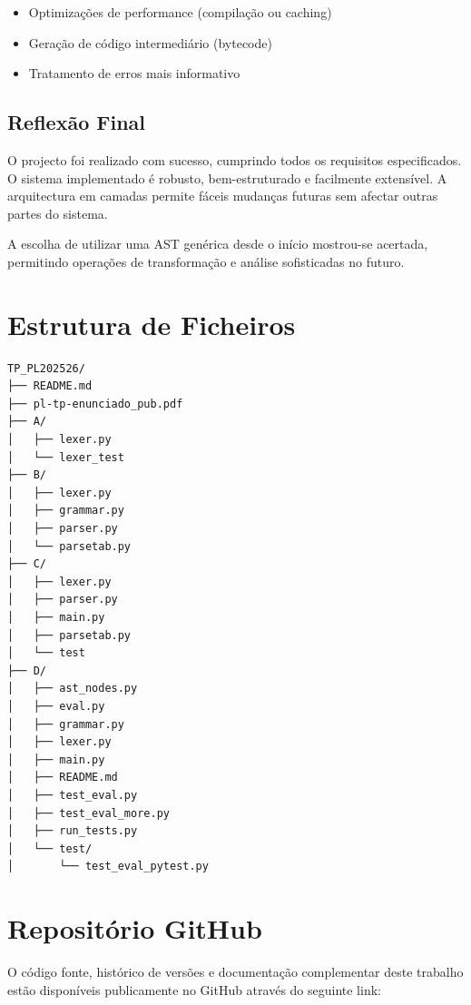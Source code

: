 \documentclass[11pt,a4paper]{report}
\begin{document}
\begin{itemize}
    \item Optimizações de performance (compilação ou caching)
    \item Geração de código intermediário (bytecode)
    \item Tratamento de erros mais informativo
\end{itemize}

\section{Reflexão Final}

O projecto foi realizado com sucesso, cumprindo todos os requisitos especificados. O sistema implementado é robusto, bem-estruturado e facilmente extensível. A arquitectura em camadas permite fáceis mudanças futuras sem afectar outras partes do sistema.

A escolha de utilizar uma AST genérica desde o início mostrou-se acertada, permitindo operações de transformação e análise sofisticadas no futuro.

\newpage
\appendix
\chapter{Estrutura de Ficheiros}

\begin{lstlisting}
TP_PL202526/
├── README.md
├── pl-tp-enunciado_pub.pdf
├── A/
│   ├── lexer.py
│   └── lexer_test
├── B/
│   ├── lexer.py
│   ├── grammar.py
│   ├── parser.py
│   └── parsetab.py
├── C/
│   ├── lexer.py
│   ├── parser.py
│   ├── main.py
│   ├── parsetab.py
│   └── test
├── D/
│   ├── ast_nodes.py
│   ├── eval.py
│   ├── grammar.py
│   ├── lexer.py
│   ├── main.py
│   ├── README.md
│   ├── test_eval.py
│   ├── test_eval_more.py
│   ├── run_tests.py
│   └── test/
│       └── test_eval_pytest.py
\end{lstlisting}

\hypersetup{
    colorlinks=true,   
    linkcolor=black,   
    urlcolor=blue,  
    citecolor=black
}

\chapter{Repositório GitHub}

O código fonte, histórico de versões e documentação complementar deste trabalho estão disponíveis publicamente no GitHub através do seguinte link:

\vspace{0.5cm}
\centering
{}
\end{document}
